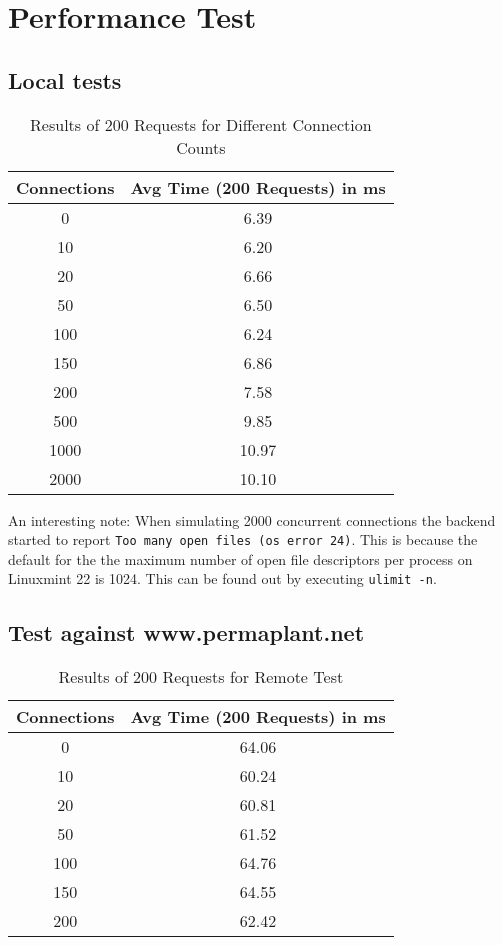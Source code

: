 \documentclass[final,oneside]{vutinfth}
\begin{document}
\section{Performance Test}
\subsection{Local tests}

\begin{table}[h!]
    \centering
    \begin{tabular}{cc}
        \toprule
        \textbf{Connections} & \textbf{Avg Time (200 Requests) in ms} \\
        \midrule
        0 & 6.39 \\
        10 & 6.20 \\
        20 & 6.66 \\
        50 & 6.50 \\
        100 & 6.24 \\
        150 & 6.86 \\
        200 & 7.58 \\
        500 & 9.85 \\
        1000 & 10.97 \\
        2000 & 10.10 \\
        \bottomrule
    \end{tabular}
    \caption{Results of 200 Requests for Different Connection Counts}
\end{table}

An interesting note: When simulating 2000 concurrent connections the backend started to report \texttt{Too many open files (os error 24)}.
This is because the default for the the maximum number of open file descriptors per process on Linuxmint 22 is 1024.
This can be found out by executing \texttt{ulimit -n}.


\subsection{Test against www.permaplant.net}

\begin{table}[h!]
    \centering
    \begin{tabular}{cc}
        \toprule
        \textbf{Connections} & \textbf{Avg Time (200 Requests) in ms} \\
        \midrule
        0 & 64.06 \\
        10 & 60.24 \\
        20 & 60.81 \\
        50 & 61.52 \\
        100 & 64.76 \\
        150 & 64.55 \\
        200 & 62.42 \\
        \bottomrule
    \end{tabular}
    \caption{Results of 200 Requests for Remote Test}
\end{table}
\end{document}
